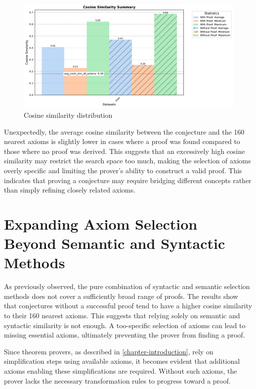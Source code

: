\documentclass[english,version-2020-11]{uzl-thesis}
\begin{document}
\begin{figure}[h!]
    \centering
    \includegraphics[width=\textwidth]{cosine_similarity_mini_noAdded_summary.pdf}
    \caption{Cosine similarity distribution}
    \label{fig:cosine_similarity}
\end{figure}
\FloatBarrier

Unexpectedly, the average cosine similarity between the conjecture and the 160 nearest axioms is slightly lower in cases where a proof was found compared to those where no proof was derived. This suggests that an excessively high cosine similarity may restrict the search space too much, making the selection of axioms overly specific and limiting the prover's ability to construct a valid proof. This indicates that proving a conjecture may require bridging different concepts rather than simply refining closely related axioms.


\section{Expanding Axiom Selection Beyond Semantic and Syntactic Methods}

As previously observed, the pure combination of syntactic and semantic selection methods does not cover a sufficiently broad range of proofs. The results show that conjectures without a successful proof tend to have a higher cosine similarity to their 160 nearest axioms. This suggests that relying solely on semantic and syntactic similarity is not enough. A too-specific selection of axioms can lead to missing essential axioms, ultimately preventing the prover from finding a proof.

Since theorem provers, as described in \ref{chapter-introduction}, rely on simplification steps using available axioms, it becomes evident that additional axioms enabling these simplifications are required. Without such axioms, the prover lacks the necessary transformation rules to progress toward a proof.
\end{document}

